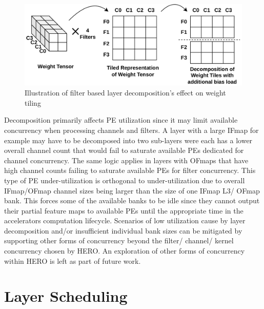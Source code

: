 \begin{figure}[ht]
    \centering
    \includegraphics[scale=0.4]{fig/OFmap_decomposition_tiling_repr.pdf}
    \caption{Illustration of filter based layer decomposition's effect on weight tiling}
    \label{fig:OFmap_decomposition:weight_tiling}
\end{figure}

Decomposition primarily affects PE utilization since it may limit available
concurrency when processing channels and filters. A layer with a large IFmap for
example may have to be decomposed into two sub-layers were each has a lower
overall channel count that would fail to saturate available PEs dedicated for
channel concurrency. The same logic applies in layers with OFmaps that have high
channel counts failing to saturate available PEs for filter concurrency. This
type of PE under-utilization is orthogonal to under-utilization due to overall
IFmap/OFmap channel sizes being larger than the size of one IFmap L3/ OFmap
bank. This forces some of the available banks to be idle since they cannot
output their partial feature maps to available PEs until the appropriate time in
the accelerators computation lifecycle. Scenarios of low utilization cause by
layer decomposition and/or insufficient individual bank sizes can be mitigated
by supporting other forms of concurrency beyond the filter/ channel/ kernel
concurrency chosen by HERO. An exploration of other forms of concurrency within
HERO is left as part of future work. 

\section{Layer Scheduling}
\label{chap:net_compile:layer_scheduling}

